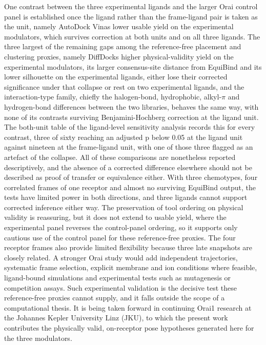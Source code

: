 One contrast between the three experimental ligands and the larger Orai control panel is established once the ligand rather than the frame-ligand pair is taken as the unit, namely AutoDock Vina\textquotesingle s lower usable yield on the experimental modulators, which survives correction at both units and on all three ligands. The three largest of the remaining gaps among the reference-free placement and clustering proxies, namely DiffDock\textquotesingle s higher physical-validity yield on the experimental modulators, its larger consensus-site distance from EquiBind and its lower silhouette on the experimental ligands, either lose their corrected significance under that collapse or rest on two experimental ligands, and the interaction-type family, chiefly the halogen-bond, hydrophobic, alkyl-\ensuremath{\pi} and hydrogen-bond differences between the two libraries, behaves the same way, with none of its contrasts surviving Benjamini-Hochberg correction at the ligand unit. The both-unit table of the ligand-level sensitivity analysis records this for every contrast, three of sixty reaching an adjusted p below 0.05 at the ligand unit against nineteen at the frame-ligand unit, with one of those three flagged as an artefact of the collapse. All of these comparisons are nonetheless reported descriptively, and the absence of a corrected difference elsewhere should not be described as proof of transfer or equivalence either. With three chemotypes, four correlated frames of one receptor and almost no surviving EquiBind output, the tests have limited power in both directions, and three ligands cannot support corrected inference either way. The preservation of tool ordering on physical validity is reassuring, but it does not extend to usable yield, where the experimental panel reverses the control-panel ordering, so it supports only cautious use of the control panel for these reference-free proxies. The four receptor frames also provide limited flexibility because three late snapshots are closely related. A stronger Orai study would add independent trajectories, systematic frame selection, explicit membrane and ion conditions where feasible, ligand-bound simulations and experimental tests such as mutagenesis or competition assays. Such experimental validation is the decisive test these reference-free proxies cannot supply, and it falls outside the scope of a computational thesis. It is being taken forward in continuing Orai1 research at the Johannes Kepler University Linz (JKU), to which the present work contributes the physically valid, on-receptor pose hypotheses generated here for the three modulators.

